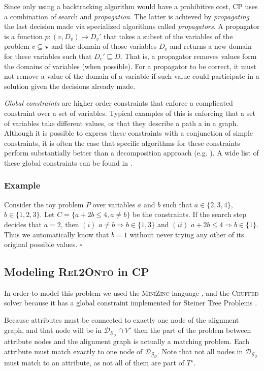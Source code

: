 \documentclass[letterpaper]{article} %
\newcommand{\minizinc}{\textsc{MiniZinc}}
\newcommand{\chuffed}{\textsc{Chuffed}}
\newcommand{\relonto}{\textsc{Rel2Onto}}
\begin{document}
Since only using a backtracking algorithm would have a prohibitive cost, CP 
uses a combination of search and \emph{propagation}. The latter is achieved by 
\emph{propagating} the last decision made via specialized algorithms called 
\emph{propagators}. A propagator is a function $p : (v, D_v) \mapsto D_v'$ that 
takes a subset of the variables of the problem $v \subseteq \boldsymbol{v}$ and 
the domain of those variables $D_v$ and returns a new domain for these 
variables 
such that $D_v' \sqsubseteq D$. That is, a propagator removes values form the 
domains of variables (when possible). For a propagator to be correct, it must 
not remove a value of the domain of a variable if such value could participate 
in a solution given the decisions already made.

\emph{Global constraints} are higher order constraints that enforce a 
complicated 
constraint over a set of variables. Typical examples of this is enforcing that 
a set of variables take different values, or that they describe a path a in a 
graph. Although it is possible to express these constraints with a conjunction 
of simple constraints, it is often the case that specific algorithms for these 
constraints perform substantially better than a decomposition approach (e.g. 
\cite{regin1994filtering}). A wide 
list of these global constraints can be found in \cite{beldiceanu2012global}.

\subsubsection{Example} Consider the toy problem $P$ over variables $a$ and $b$ 
such that $a \in \{2,3,4\}$, $b \in \{1,2,3\}$. Let $C = \{a + 2b \leq 4, a 
\neq b\}$ be the constraints. If the search step decides that $a = 
2$, then $(i)$ $a \neq b \Rightarrow b \in \{1,3\}$ and $(ii)$ $a + 2b \leq 4  
\Rightarrow b \in \{1\}$. Thus we automatically know that $b = 1$ without never 
trying any other of its original possible values. $\square$


\subsection{Modeling \relonto{} in CP}
In order to model this problem we used the \minizinc{} language 
\cite{minizinc}, and the 
\chuffed{} solver \cite{chu2011improving} because it has a global constraint 
implemented for Steiner 
Tree Problems \cite{deuna2016steiner}. 

Because attributes must be connected to exactly one node of the alignment 
graph, and that node will be in $\mathcal{D_{G_O}} \cap V^\star$ 
then the part of the problem between attribute nodes and the alignment graph is 
actually a matching problem. Each attribute must match exactly to one node of 
$\mathcal{D_{G_O}}$. Note that not all nodes in $\mathcal{D_{G_O}}$ must match 
to an attribute, as not all of them are part of $T^\star$.
\end{document}
